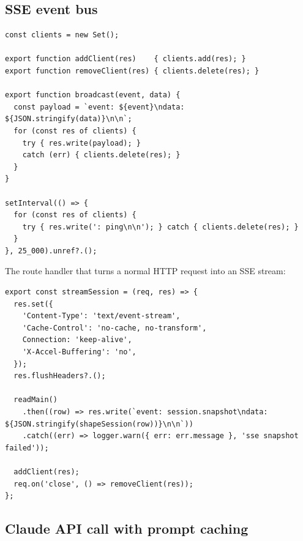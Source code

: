 \subsection{SSE event bus}

\begin{lstlisting}[caption={\texttt{server/services/eventBus.js}},label={lst:bus}]
const clients = new Set();

export function addClient(res)    { clients.add(res); }
export function removeClient(res) { clients.delete(res); }

export function broadcast(event, data) {
  const payload = `event: ${event}\ndata: ${JSON.stringify(data)}\n\n`;
  for (const res of clients) {
    try { res.write(payload); }
    catch (err) { clients.delete(res); }
  }
}

setInterval(() => {
  for (const res of clients) {
    try { res.write(': ping\n\n'); } catch { clients.delete(res); }
  }
}, 25_000).unref?.();
\end{lstlisting}

The route handler that turns a normal HTTP request into an SSE stream:

\begin{lstlisting}[caption={SSE handler in \texttt{sessionController.js}},label={lst:sse}]
export const streamSession = (req, res) => {
  res.set({
    'Content-Type': 'text/event-stream',
    'Cache-Control': 'no-cache, no-transform',
    Connection: 'keep-alive',
    'X-Accel-Buffering': 'no',
  });
  res.flushHeaders?.();

  readMain()
    .then((row) => res.write(`event: session.snapshot\ndata: ${JSON.stringify(shapeSession(row))}\n\n`))
    .catch((err) => logger.warn({ err: err.message }, 'sse snapshot failed'));

  addClient(res);
  req.on('close', () => removeClient(res));
};
\end{lstlisting}

\subsection{Claude API call with prompt caching}

